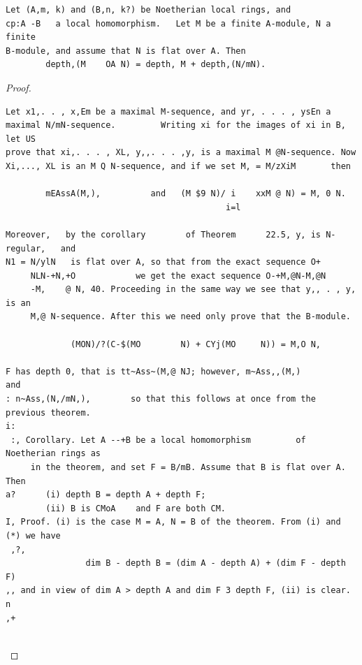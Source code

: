 \begin{theorem}\label{mcrt-auto-theorem-23-3}\uses{}
\begin{verbatim}
Let (A,m, k) and (B,n, k?) be Noetherian local rings, and
cp:A -B   a local homomorphism.   Let M be a finite A-module, N a finite
B-module, and assume that N is flat over A. Then
        depth,(M    OA N) = depth, M + depth,(N/mN).
\end{verbatim}
\end{theorem}
\begin{proof}
\begin{verbatim}
Let x1,. . , x,Em be a maximal M-sequence, and yr, . . . , ysEn a
maximal N/mN-sequence.         Writing xi for the images of xi in B, let US
prove that xi,. . . , XL, y,,. . . ,y, is a maximal M @N-sequence. Now
Xi,..., XL is an M Q N-sequence, and if we set M, = M/zXiM       then

        mEAssA(M,),          and   (M $9 N)/ i    xxM @ N) = M, 0 N.
                                            i=l

Moreover,   by the corollary        of Theorem      22.5, y, is N-regular,   and
N1 = N/ylN   is flat over A, so that from the exact sequence O+
     NLN-+N,+O            we get the exact sequence O-+M,@N-M,@N
     -M,    @ N, 40. Proceeding in the same way we see that y,, . , y, is an
     M,@ N-sequence. After this we need only prove that the B-module.

             (MON)/?(C-$(MO        N) + CYj(MO     N)) = M,O N,

F has depth 0, that is tt~Ass~(M,@ NJ; however, m~Ass,,(M,)                   and
: n~Ass,(N,/mN,),        so that this follows at once from the previous theorem.
i:
 :, Corollary. Let A --+B be a local homomorphism         of Noetherian rings as
     in the theorem, and set F = B/mB. Assume that B is flat over A. Then
a?      (i) depth B = depth A + depth F;
        (ii) B is CMoA    and F are both CM.
I, Proof. (i) is the case M = A, N = B of the theorem. From (i) and (*) we have
 ,?,
                dim B - depth B = (dim A - depth A) + (dim F - depth F)
,, and in view of dim A > depth A and dim F 3 depth F, (ii) is clear. n
,+


\end{verbatim}
\end{proof}
